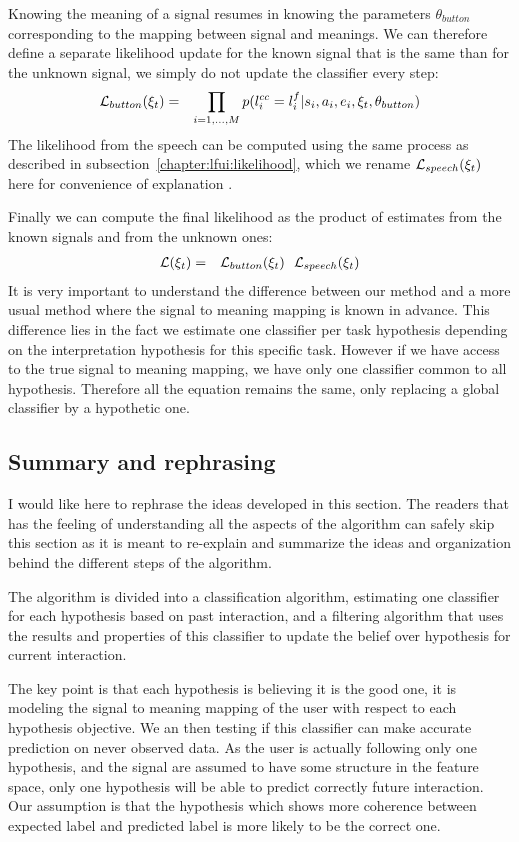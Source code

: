 Knowing the meaning of a signal resumes in knowing the parameters $\theta_{button}$ corresponding to the mapping between signal and meanings. We can therefore define a separate likelihood update for the known signal that is the same than for the unknown signal, we simply do not update the classifier every step:
%
\begin{eqnarray}
\mathcal{L}_{button}(\xi_t) &=& \prod_{i = 1,\ldots, M} p(l^{cc}_i = l^f_i | s_i, a_i, e_i, \xi_t, \theta_{button})
\end{eqnarray}
%
The likelihood from the speech can be computed using the same process as described in subsection~\ref{chapter:lfui:likelihood}, which we rename $\mathcal{L}_{speech}(\xi_t)$ here for convenience of explanation .

Finally we can compute the final likelihood as the product of estimates from the known signals and from the unknown ones:
%
\begin{eqnarray}
\mathcal{L}(\xi_t) &=& \mathcal{L}_{button}(\xi_t) ~~ \mathcal{L}_{speech}(\xi_t)
\end{eqnarray}
%
It is very important to understand the difference between our method and a more usual method where the signal to meaning mapping is known in advance. This difference lies in the fact we estimate one classifier per task hypothesis depending on the interpretation hypothesis for this specific task. However if we have access to the true signal to meaning mapping, we have only one classifier common to all hypothesis. Therefore all the equation remains the same, only replacing a global classifier by a hypothetic one.

\subsection{Summary and rephrasing}

I would like here to rephrase the ideas developed in this section. The readers that has the feeling of understanding all the aspects of the algorithm can safely skip this section as it is meant to re-explain and summarize the ideas and organization behind the different steps of the algorithm.

The algorithm is divided into a classification algorithm, estimating one classifier for each hypothesis based on past interaction, and a filtering algorithm that uses the results and properties of this classifier to update the belief over hypothesis for current interaction.

The key point is that each hypothesis is believing it is the good one, it is modeling the signal to meaning mapping of the user with respect to each hypothesis objective. We an then testing if this classifier can make accurate prediction on never observed data. As the user is actually following only one hypothesis, and the signal are assumed to have some structure in the feature space, only one hypothesis will be able to predict correctly future interaction. Our assumption is that the hypothesis which shows more coherence between expected label and predicted label is more likely to be the correct one.

